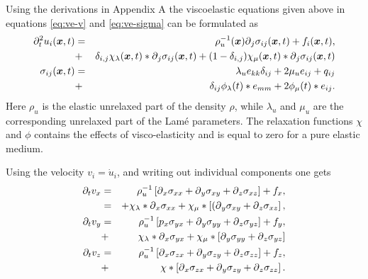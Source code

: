 \documentclass[11pt]{article}
\begin{document}
Using the derivations in Appendix A the viscoelastic equations given
above in equations \eqref{eq:ve-v} and \eqref{eq:ve-sigma}
can be formulated as
\begin{eqnarray}
  \partial^2_t{u_i(\mbox{\boldmath $x$}, t)} 
              & = & \rho^{-1}_u(\mbox{\boldmath $x$})\mbox{$\partial$}_j \sigma_{ij}(\mbox{\boldmath $x$}, t) 
                                           +f_i(\mbox{\boldmath $x$},t),     \nonumber\\
              & + & \delta_{i,j}\chi_{\lambda}(\mbox{\boldmath $x$},t)*\mbox{$\partial$}_j \sigma_{ij}(\mbox{\boldmath $x$}, t)
                + (1-\delta_{i,j})\chi_{\mu}(\mbox{\boldmath $x$},t)*\mbox{$\partial$}_j\sigma_{ij}(\mbox{\boldmath $x$},t) \\
					   \label{eq:v}
  \sigma_{ij}(\mbox{\boldmath $x$}, t) & = & 
                            \lambda_u e_{kk}\delta_{ij} + 2\mu_u e_{ij} 
                                               +q_{ij}          \nonumber\\
                      & + & \delta_{ij}\phi_{\lambda}(t)*e_{mm} 
                                         +2\phi_{\mu}(t)*e_{ij}.
					  \label{eq:sigma}
\end{eqnarray}
Here $\rho_u$ is the elastic unrelaxed part of the density $\rho$, 
while $\lambda_u$ and $\mu_u$ are the corresponding unrelaxed part
of the Lam\'{e} parameters. The relaxation functions $\chi$ and $\phi$ contains
the effects of visco-elasticity and is equal to zero for a pure elastic medium.

Using the velocity $v_i = \dot{u}_i$, and writing out individual components one gets
\begin{eqnarray}
  \partial_t{v}_x & = & \rho^{-1}_u\left[\mbox{$\partial$}_x \sigma_{xx} +\mbox{$\partial$}_y \sigma_{xy} 
                                    +\mbox{$\partial$}_z \sigma_{xz}\right] + f_x, \nonumber\\
            & = & + \chi_{\lambda}*\mbox{$\partial$}_x \sigma_{xx} 
                                    +\chi_{\mu}*\left[(\mbox{$\partial$}_y \sigma_{xy} 
                                    +\mbox{$\partial$}_z \sigma_{xz}\right],       \nonumber\\
  \partial_t{v}_y & = & \rho^{-1}_u\left[p_x \sigma_{yx} +\mbox{$\partial$}_y \sigma_{yy} 
                                    +\mbox{$\partial$}_z \sigma_{yz}\right] + f_y, \nonumber\\
            & + & \chi_{\lambda}*\mbox{$\partial$}_x \sigma_{yx} 
                                    +\chi_{\mu}*\left[\mbox{$\partial$}_y \sigma_{yy} 
                                    +\mbox{$\partial$}_z \sigma_{yz}\right]        \nonumber\\
  \partial_t{v}_z & = & \rho^{-1}_u\left[\mbox{$\partial$}_x \sigma_{zx} +\mbox{$\partial$}_y \sigma_{zy} 
                                    +\mbox{$\partial$}_z \sigma_{zz}\right] + f_z, \nonumber\\
            & + & \chi*\left[\mbox{$\partial$}_x \sigma_{zx} +\mbox{$\partial$}_y \sigma_{zy} 
                                    +\mbox{$\partial$}_z \sigma_{zz}\right].
\end{eqnarray}
\end{document}
